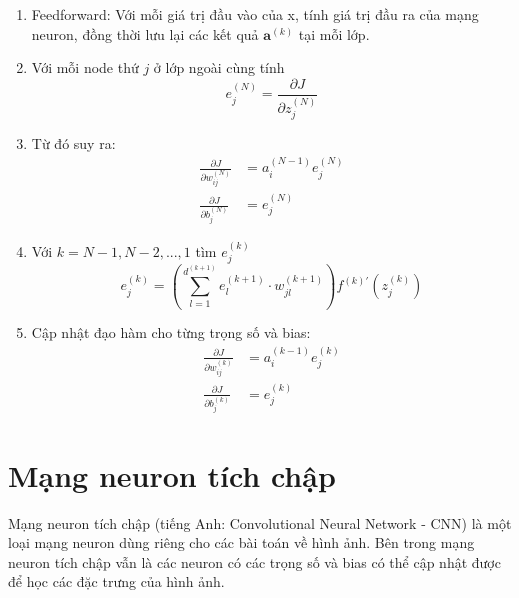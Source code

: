 \begin{enumerate}
	\item Feedforward: Với mỗi giá trị đầu vào của x, tính giá trị đầu ra của mạng neuron, đồng thời lưu lại các kết quả ${\boldsymbol{a}}^{(k)}$ tại mỗi lớp.
	\item Với mỗi node thứ $j$ ở lớp ngoài cùng tính
\begin{equation}
	{e_{j}^{(N)}}
	=
	\frac
		{ {\partial} J }
		{ {\partial} {z_{j}^{(N)}} }
\end{equation}
	\item Từ đó suy ra:
\begin{align*}
	\frac
		{ {\partial} J }
		{ {\partial} {w_{ij}^{(N)}} }
	&=
	{a_{i}^{(N-1)}}
	{e_{j}^{(N)}} \\
	\frac
		{ {\partial} J }
		{ {\partial} {b_{j}^{(N)}} }
	&=
	{ e_{j}^{(N)} }
\end{align*}
	\item Với $k=N-1,N-2,...,1$ tìm $e_{j}^{(k)}$
\begin{equation}
	e_{j}^{(k)}
	=
	\left( 
		{\sum_{l=1}^{d^{(k+1)}}}
		e_{l}^{(k+1)}
		{\cdot}
		w_{jl}^{(k+1)}
	\right) 
	{
		{f^{(k)'}} 
		\left( 
			{z_{j}^{(k)}} 
	 	\right)
	}
\end{equation}
	\item Cập nhật đạo hàm cho từng trọng số và bias:
\begin{align*}
	\frac
		{ {\partial} J }
		{ {\partial} {w_{ij}^{(k)}} }
	&=
	{a_{i}^{(k-1)}}
	{e_{j}^{(k)}} \\
	\frac
	{ {\partial} J }
		{ {\partial} {b_{j}^{(k)}} }
	&=
	{ e_{j}^{(k)} }
\end{align*}
\end{enumerate}
\section{Mạng neuron tích chập}
Mạng neuron tích chập (tiếng Anh: Convolutional Neural Network - CNN) là một loại mạng neuron dùng riêng cho các bài toán về hình ảnh. Bên trong mạng neuron tích chập vẫn là các neuron có các trọng số và bias có thể cập nhật được để học các đặc trưng của hình ảnh.

